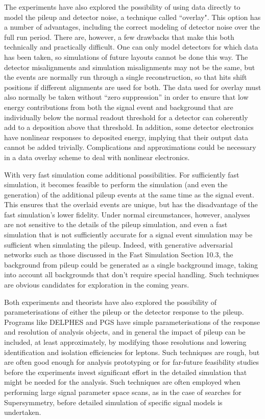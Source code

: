 \documentclass[12pt,a4paper]{article}
\begin{document}
The experiments have also explored the possibility of using data
directly to model the pileup and detector noise, a technique called
``overlay". This option has a number of advantages, including the
correct modeling of detector noise over the full run period. There are,
however, a few drawbacks that make this both technically and practically
difficult. One can only model detectors for which data has been taken,
so simulations of future layouts cannot be done this way. The detector
misalignments and simulation misalignments may not be the same, but the
events are normally run through a single reconstruction, so that hits
shift positions if different alignments are used for both. The data used
for overlay must also normally be taken without ``zero suppression'' in
order to ensure that low energy contributions from both the signal event
and background that are individually below the normal readout threshold
for a detector can coherently add to a deposition above that threshold.
In addition, some detector electronics have nonlinear responses to
deposited energy, implying that their output data cannot be added
trivially. Complications and approximations could be necessary in a data
overlay scheme to deal with nonlinear electronics.

With very fast simulation come additional possibilities. For
sufficiently fast simulation, it becomes feasible to perform the
simulation (and even the generation) of the additional pileup events at
the same time as the signal event. This ensures that the overlaid events
are unique, but has the disadvantage of the fast simulation's lower
fidelity. Under normal circumstances, however, analyses are not
sensitive to the details of the pileup simulation, and even a fast
simulation that is not sufficiently accurate for a signal event
simulation may be sufficient when simulating the pileup. Indeed, with
generative adversarial networks such as those discussed in the Fast
Simulation Section 10.3, the background from pileup could be generated
as a single background image, taking into account all backgrounds that
don't require special handling. Such techniques are obvious candidates
for exploration in the coming years.

Both experiments and theorists have also explored the possibility of
parameterisations of either the pileup or the detector response to the
pileup. Programs like DELPHES and PGS have simple parameterisations of
the response and resolution of analysis objects, and in general the
impact of pileup can be included, at least approximately, by modifying
those resolutions and lowering identification and isolation efficiencies
for leptons. Such techniques are rough, but are often good enough for
analysis prototyping or for far-future feasibility studies before the
experiments invest significant effort in the detailed simulation that
might be needed for the analysis. Such techniques are often employed
when performing large signal parameter space scans, as in the case of
searches for Supersymmetry, before detailed simulation of specific
signal models is undertaken.
\end{document}
